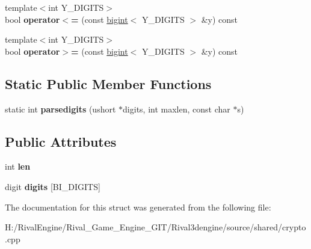 \begin{DoxyCompactItemize}
\item 
\mbox{\label{structbigint_ae3eea80018ba3c4348586b412be3674f}} 
{\footnotesize template$<$int Y\+\_\+\+D\+I\+G\+I\+TS$>$ }\\bool {\bfseries operator$<$=} (const \hyperlink{structbigint}{bigint}$<$ Y\+\_\+\+D\+I\+G\+I\+TS $>$ \&y) const
\item 
\mbox{\label{structbigint_a638bc743bb86d6df3d0f30ad5b771685}} 
{\footnotesize template$<$int Y\+\_\+\+D\+I\+G\+I\+TS$>$ }\\bool {\bfseries operator$>$=} (const \hyperlink{structbigint}{bigint}$<$ Y\+\_\+\+D\+I\+G\+I\+TS $>$ \&y) const
\end{DoxyCompactItemize}
\subsection*{Static Public Member Functions}
\begin{DoxyCompactItemize}
\item 
\mbox{\label{structbigint_aa307c43dfccd4ecf23aaa4533635eb4a}} 
static int {\bfseries parsedigits} (ushort $\ast$digits, int maxlen, const char $\ast$s)
\end{DoxyCompactItemize}
\subsection*{Public Attributes}
\begin{DoxyCompactItemize}
\item 
\mbox{\label{structbigint_af00912d392799078ac8eb452a3b04d5a}} 
int {\bfseries len}
\item 
\mbox{\label{structbigint_a0e5b25c406c20d6156f12bfd3f7e8596}} 
digit {\bfseries digits} \mbox{[}B\+I\+\_\+\+D\+I\+G\+I\+TS\mbox{]}
\end{DoxyCompactItemize}


The documentation for this struct was generated from the following file\+:\begin{DoxyCompactItemize}
\item 
H\+:/\+Rival\+Engine/\+Rival\+\_\+\+Game\+\_\+\+Engine\+\_\+\+G\+I\+T/\+Rival3dengine/source/shared/crypto.\+cpp\end{DoxyCompactItemize}
